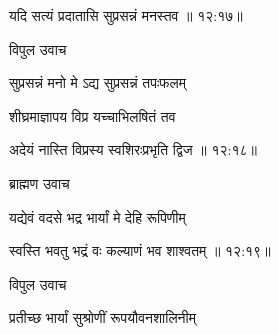 
{\devanagarifont यदि सत्यं प्रदातासि सुप्रसन्नं मनस्तव {॥ १२:१७॥} \veg\dontdisplaylinenum }%
     \var{{\devanagarifont \numnoemph\vc \lem \mssALL, \om\ \msCc}}%

{\devanagarifont विपुल उवाच {\dandab}\dontdisplaylinenum  }%
 
{\devanagarifont सुप्रसन्नं मनो मे ऽद्य सुप्रसन्नं तपःफलम् \thinspace{\danda} \dontdisplaylinenum }%

{\devanagarifont शीघ्रमाज्ञापय विप्र यच्चाभिलषितं तव  \danda\dontdisplaylinenum }%


{\devanagarifont अदेयं नास्ति विप्रस्य स्वशिरःप्रभृति द्विज {॥ १२:१८॥} \veg\dontdisplaylinenum }%

{\devanagarifont ब्राह्मण उवाच {\dandab}\dontdisplaylinenum  }%

{\devanagarifont यद्येवं वदसे भद्र भार्यां मे देहि रूपिणीम् \thinspace{\danda} \dontdisplaylinenum }%


{\devanagarifont स्वस्ति भवतु भद्रं वः कल्याणं भव शाश्वतम् {॥ १२:१९॥} \veg\dontdisplaylinenum }%

{\devanagarifont विपुल उवाच {\dandab}\dontdisplaylinenum  }%

{\devanagarifont प्रतीच्छ भार्यां सुश्रोणीं रूपयौवनशालिनीम् \thinspace{\danda} \dontdisplaylinenum }%

